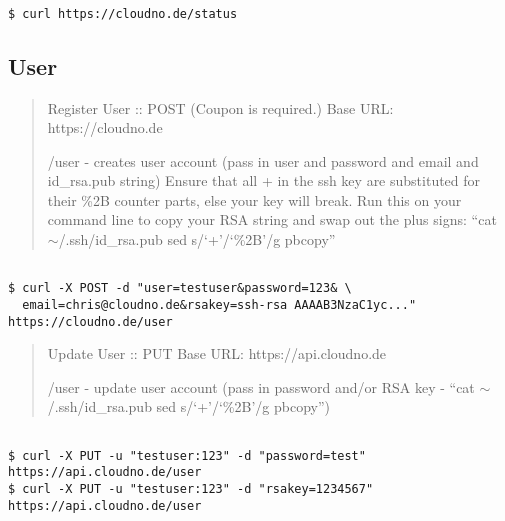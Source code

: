 \begin{adjustwidth}{2.5em}{2.5em}
\begin{verbatim}

$ curl https://cloudno.de/status

\end{verbatim}
\end{adjustwidth}



\subsection{User}
\label{user}

\begin{quote}

Register User :: POST (Coupon is required.)
Base URL: https:/\slash cloudno.de

\slash user - creates user account (pass in user and password and email and id\_rsa.pub string) Ensure that all + in the ssh key are substituted for their \%2B counter parts, else your key will break. Run this on your command line to copy your RSA string and swap out the plus signs: ``cat \ensuremath{\sim}\slash .ssh\slash id\_rsa.pub \textbar{} sed s\slash `+'\slash `\%2B'\slash g \textbar{} pbcopy''
\end{quote}

\begin{adjustwidth}{2.5em}{2.5em}
\begin{verbatim}

$ curl -X POST -d "user=testuser&password=123& \
  email=chris@cloudno.de&rsakey=ssh-rsa AAAAB3NzaC1yc..." https://cloudno.de/user

\end{verbatim}
\end{adjustwidth}

\begin{quote}

Update User :: PUT
Base URL: https:/\slash api.cloudno.de

\slash user - update user account (pass in password and\slash or RSA key - ``cat \ensuremath{\sim}\slash .ssh\slash id\_rsa.pub \textbar{} sed s\slash `+'\slash `\%2B'\slash g \textbar{} pbcopy'')
\end{quote}

\begin{adjustwidth}{2.5em}{2.5em}
\begin{verbatim}

$ curl -X PUT -u "testuser:123" -d "password=test" https://api.cloudno.de/user
$ curl -X PUT -u "testuser:123" -d "rsakey=1234567" https://api.cloudno.de/user

\end{verbatim}
\end{adjustwidth}

